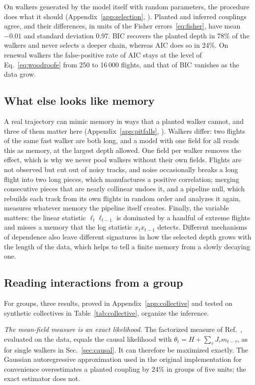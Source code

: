 On walkers generated by the model itself with random parameters, the procedure does what it should (Appendix~\ref{app:selection}, ). Planted and inferred couplings agree, and their differences, in units of the Fisher errors~\eqref{eq:fisher}, have mean $-0.01$ and standard deviation 0.97. BIC recovers the planted depth in 78\% of the walkers and never selects a deeper chain, whereas AIC does so in 24\%. On renewal walkers the false-positive rate of AIC stays at the level of Eq.~\eqref{eq:woodroofe} from 250 to 16\,000 flights, and that of BIC vanishes as the data grow.

\subsection{What else looks like memory}\label{sec:masquerade}

A real trajectory can mimic memory in ways that a planted walker cannot, and three of them matter here (Appendix~\ref{app:pitfalls}, ). Walkers differ: two flights of the same fast walker are both long, and a model with one field for all reads this as memory, at the largest depth allowed. One field per walker removes the effect, which is why we never pool walkers without their own fields. Flights are not observed but cut out of noisy tracks, and noise occasionally breaks a long flight into two long pieces, which manufactures a positive correlation; merging consecutive pieces that are nearly collinear undoes it, and a pipeline null, which rebuilds each track from its own flights in random order and analyzes it again, measures whatever memory the pipeline itself creates. Finally, the variable matters: the linear statistic $\ell_t\ell_{t-1}$ is dominated by a handful of extreme flights and misses a memory that the log statistic $x_tx_{t-1}$ detects. Different mechanisms of dependence also leave different signatures in how the selected depth grows with the length of the data, which helps to tell a finite memory from a slowly decaying one.

\subsection{Reading interactions from a group}\label{sec:groupavg}

For groups, three results, proved in Appendix~\ref{app:collective} and tested on synthetic collectives in Table~\ref{tab:collective}, organize the inference.

\emph{The mean-field measure is an exact likelihood.} The factorized measure of Ref.~\cite{Agliari2024}, evaluated on the data, equals the causal likelihood with $\theta_t=H+\sum_\tau J_\tau m_{t-\tau}$, as for single walkers in Sec.~\ref{sec:causal}. It can therefore be maximized exactly. The Gaussian autoregressive approximation used in the original implementation for convenience overestimates a planted coupling by 24\% in groups of five units; the exact estimator does not.

